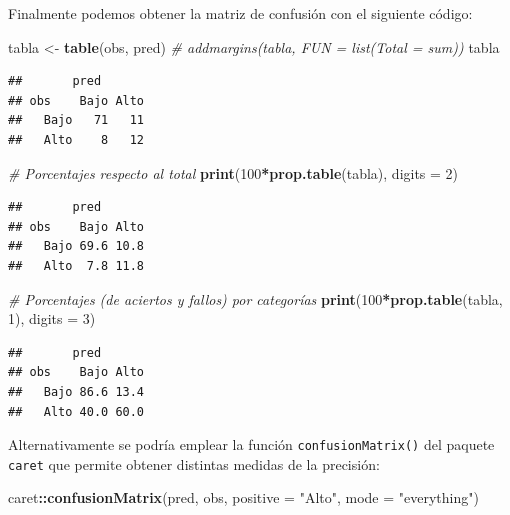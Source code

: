 \documentclass[]{book}
\newenvironment{Shaded}{\begin{snugshade}}{\end{snugshade}}
\newcommand{\KeywordTok}[1]{\textcolor[rgb]{0.13,0.29,0.53}{\textbf{#1}}}
\newcommand{\DataTypeTok}[1]{\textcolor[rgb]{0.13,0.29,0.53}{#1}}
\newcommand{\DecValTok}[1]{\textcolor[rgb]{0.00,0.00,0.81}{#1}}
\newcommand{\StringTok}[1]{\textcolor[rgb]{0.31,0.60,0.02}{#1}}
\newcommand{\CommentTok}[1]{\textcolor[rgb]{0.56,0.35,0.01}{\textit{#1}}}
\newcommand{\OperatorTok}[1]{\textcolor[rgb]{0.81,0.36,0.00}{\textbf{#1}}}
\newcommand{\NormalTok}[1]{#1}
\theoremstyle{break}
\theoremstyle{definition}
\theoremstyle{definition}
\theoremstyle{definition}
\theoremstyle{remark}
\begin{document}
Finalmente podemos obtener la matriz de confusión con el siguiente
código:

\begin{Shaded}
\begin{Highlighting}[]
\NormalTok{tabla <-}\StringTok{ }\KeywordTok{table}\NormalTok{(obs, pred)}
\CommentTok{# addmargins(tabla, FUN = list(Total = sum))}
\NormalTok{tabla}
\end{Highlighting}
\end{Shaded}

\begin{verbatim}
##       pred
## obs    Bajo Alto
##   Bajo   71   11
##   Alto    8   12
\end{verbatim}

\begin{Shaded}
\begin{Highlighting}[]
\CommentTok{# Porcentajes respecto al total}
\KeywordTok{print}\NormalTok{(}\DecValTok{100}\OperatorTok{*}\KeywordTok{prop.table}\NormalTok{(tabla), }\DataTypeTok{digits =} \DecValTok{2}\NormalTok{) }
\end{Highlighting}
\end{Shaded}

\begin{verbatim}
##       pred
## obs    Bajo Alto
##   Bajo 69.6 10.8
##   Alto  7.8 11.8
\end{verbatim}

\begin{Shaded}
\begin{Highlighting}[]
\CommentTok{# Porcentajes (de aciertos y fallos) por categorías}
\KeywordTok{print}\NormalTok{(}\DecValTok{100}\OperatorTok{*}\KeywordTok{prop.table}\NormalTok{(tabla, }\DecValTok{1}\NormalTok{), }\DataTypeTok{digits =} \DecValTok{3}\NormalTok{) }
\end{Highlighting}
\end{Shaded}

\begin{verbatim}
##       pred
## obs    Bajo Alto
##   Bajo 86.6 13.4
##   Alto 40.0 60.0
\end{verbatim}

Alternativamente se podría emplear la función \texttt{confusionMatrix()}
del paquete \texttt{caret} que permite obtener distintas medidas de la
precisión:

\begin{Shaded}
\begin{Highlighting}[]
\NormalTok{caret}\OperatorTok{::}\KeywordTok{confusionMatrix}\NormalTok{(pred, obs, }\DataTypeTok{positive =} \StringTok{"Alto"}\NormalTok{, }\DataTypeTok{mode =} \StringTok{"everything"}\NormalTok{)}
\end{Highlighting}
\end{Shaded}
\end{document}
